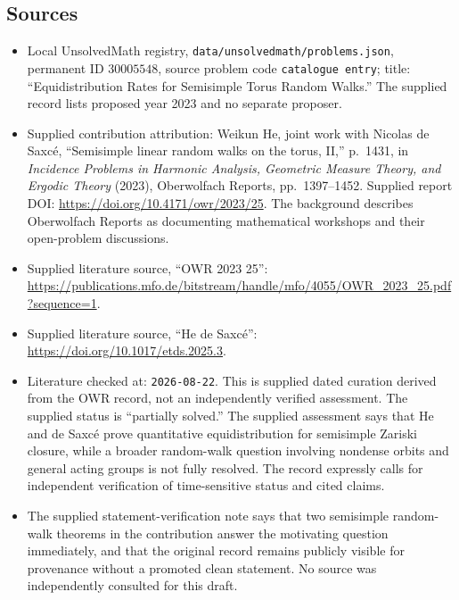\documentclass[11pt]{article}
\begin{document}
\subsection{Sources}
\begin{itemize}
\item Local UnsolvedMath registry, \texttt{data/unsolvedmath/problems.json}, permanent ID \(30005548\), source problem code \texttt{catalogue entry}; title: ``Equidistribution Rates for Semisimple Torus Random Walks.'' The supplied record lists proposed year 2023 and no separate proposer.
\item Supplied contribution attribution: Weikun He, joint work with Nicolas de Saxc\'e, ``Semisimple linear random walks on the torus, II,'' p.~1431, in \emph{Incidence Problems in Harmonic Analysis, Geometric Measure Theory, and Ergodic Theory} (2023), Oberwolfach Reports, pp.~1397--1452. Supplied report DOI: \url{https://doi.org/10.4171/owr/2023/25}. The background describes Oberwolfach Reports as documenting mathematical workshops and their open-problem discussions.
\item Supplied literature source, ``OWR 2023 25'': \url{https://publications.mfo.de/bitstream/handle/mfo/4055/OWR_2023_25.pdf?sequence=1}.
\item Supplied literature source, ``He de Saxc\'e'': \url{https://doi.org/10.1017/etds.2025.3}.
\item Literature checked at: \texttt{2026-08-22}. This is supplied dated curation derived from the OWR record, not an independently verified assessment. The supplied status is ``partially solved.'' The supplied assessment says that He and de Saxc\'e prove quantitative equidistribution for semisimple Zariski closure, while a broader random-walk question involving nondense orbits and general acting groups is not fully resolved. The record expressly calls for independent verification of time-sensitive status and cited claims.
\item The supplied statement-verification note says that two semisimple random-walk theorems in the contribution answer the motivating question immediately, and that the original record remains publicly visible for provenance without a promoted clean statement. No source was independently consulted for this draft.
\end{itemize}
\end{document}
